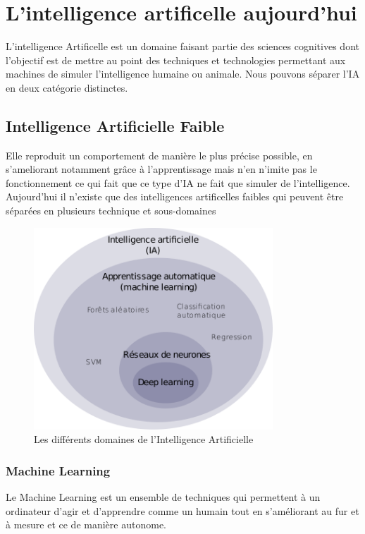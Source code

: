 \chapter{L'intelligence artificelle aujourd'hui}
L'intelligence Artificelle est un domaine faisant partie 
des sciences cognitives dont l'objectif est de mettre au
point des techniques et technologies permettant aux 
machines de simuler l'intelligence humaine ou animale.
Nous pouvons séparer l'IA en deux catégorie distinctes. 

\section{Intelligence Artificielle Faible}
Elle reproduit un comportement de manière le plus précise possible,
en s'ameliorant notamment grâce à l'apprentissage 
mais n'en n'imite pas le fonctionnement ce qui fait que
ce type d'IA ne fait que simuler de l'intelligence. \newline
Aujourd'hui il n'existe que des intelligences artificelles faibles qui peuvent  
être séparées en plusieurs technique et sous-domaines \newline

\begin{figure}[!h]
    \centering
    \includegraphics[width=0.8\textwidth]{Images/aitype}
    \caption{Les différents domaines de l'Intelligence Artificielle}
	\label{fig:categorieIA}
\end{figure}
\newpage

\subsection{Machine Learning}
Le Machine Learning est un ensemble de techniques qui permettent à un ordinateur 
d'agir et d'apprendre comme un humain tout en s'améliorant au fur et 
à mesure et ce de manière autonome. \newline


